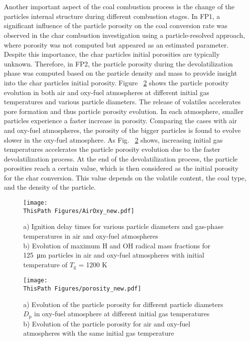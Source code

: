 \begin{btUnit}
\\\\
Another important aspect of the coal combustion process is the change of the particles internal structure during different combustion stages. In FP1, a significant influence of the particle porosity on the coal conversion rate was observed in the char combustion investigation using a particle-resolved approach, where porosity was not computed but appeared as an estimated parameter. Despite this importance, the char particles initial porosities are typically unknown. Therefore, in FP2, the particle porosity during the devolatilization phase was computed based on the particle density and mass to provide insight into the char particles initial porosity. Figure ~\ref{fig:B3SinglePorosity} shows the particle porosity evolution in both air and oxy-fuel atmospheres at different initial gas temperatures and various particle diameters. The release of volatiles accelerates pore formation and thus particle porosity evolution. In each atmosphere, smaller particles experience a faster increase in porosity. Comparing the cases with air and oxy-fuel atmospheres, the porosity of the bigger particles is found to evolve slower in the oxy-fuel atmosphere. As Fig. ~\ref{fig:B3SinglePorosity} shows, increasing initial gas temperatures accelerates the particle porosity evolution due to the faster devolatilization process. At the end of the devolatilization process, the particle porosities reach a certain value, which is then considered as the initial porosity for the char conversion. This value depends on the volatile content, the coal type, and the density of the particle.
\begin{figure}
	\texttt{[image: \\ThisPath Figures/AirOxy\_new.pdf]}
	\caption{a) Ignition delay times for various particle diameters and gas-phase temperatures in air and oxy-fuel atmospheres\\b) Evolution of maximum H and OH radical mass fractions for \SI{125}{\micro\metre} particles in air and oxy-fuel atmospheres with initial temperature of $T_\mathrm{g}$ = 1200 K}\label{fig:B3SingleAirOxy}
\end{figure}
\begin{figure}
	\texttt{[image: \\ThisPath Figures/porosity\_new.pdf]}
	\caption{a) Evolution of the particle porosity for different particle diameters $D_\mathrm{p}$ in oxy-fuel atmosphere at different initial gas temperatures\\b) Evolution of the particle porosity for air and oxy-fuel atmospheres with the same initial gas temperature}\label{fig:B3SinglePorosity}
\end{figure}



\end{btUnit}
